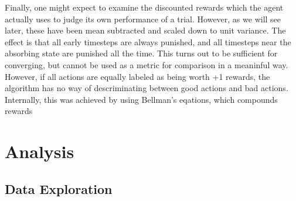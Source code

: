 \documentclass[12pt,a4paper]{article}
\begin{document}
Finally, one might expect to examine the discounted rewards which the agent actually uses to judge its own performance of a trial. However, as we will see later, these have been mean subtracted and scaled down to unit variance. The effect is that all early timesteps are always punished, and all timesteps near the absorbing state are punished all the time. This turns out to be sufficient for converging, but cannot be used as a metric for comparison in a meaninful way.
%
However, if all actions are equally labeled as being worth +1 rewards, the algorithm has no way of descriminating between good actions and bad actions. Internally, this was achieved by using Bellman's eqations, which compounds rewards
%
%
%

\section{Analysis}
%
\subsection*{Data Exploration}
\end{document}
